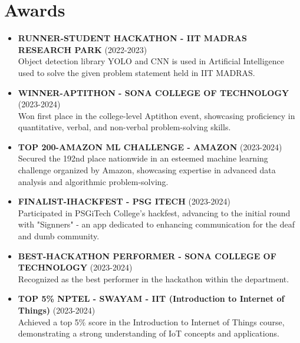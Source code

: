 \documentclass[a4paper,12pt]{article}
\begin{document}
\section{Awards}
{\begin{itemize}[label=\textbullet]
      \item \textbf{RUNNER-STUDENT HACKATHON - IIT MADRAS RESEARCH PARK} (2022-2023) \\
      Object detection library YOLO and CNN is used in Artificial Intelligence used to solve the given problem statement held in IIT MADRAS.
      
      \item \textbf{WINNER-APTITHON - SONA COLLEGE OF TECHNOLOGY} (2023-2024) \\
      Won first place in the college-level Aptithon event, showcasing proficiency in quantitative, verbal, and non-verbal problem-solving skills.
      
      \item \textbf{TOP 200-AMAZON ML CHALLENGE - AMAZON} (2023-2024) \\
      Secured the 192nd place nationwide in an esteemed machine learning challenge organized by Amazon, showcasing expertise in advanced data analysis and algorithmic problem-solving.
      
      \item \textbf{FINALIST-IHACKFEST - PSG ITECH} (2023-2024) \\
      Participated in PSGiTech College's hackfest, advancing to the initial round with "Signners" - an app dedicated to enhancing communication for the deaf and dumb community.
      
      \item \textbf{BEST-HACKATHON PERFORMER - SONA COLLEGE OF TECHNOLOGY} (2023-2024) \\
      Recognized as the best performer in the hackathon within the department.
      
      \item \textbf{TOP 5\% NPTEL - SWAYAM - IIT (Introduction to Internet of Things)} (2023-2024) \\
      Achieved a top 5\% score in the Introduction to Internet of Things course, demonstrating a strong understanding of IoT concepts and applications.
  \end{itemize}} 



\end{document}
